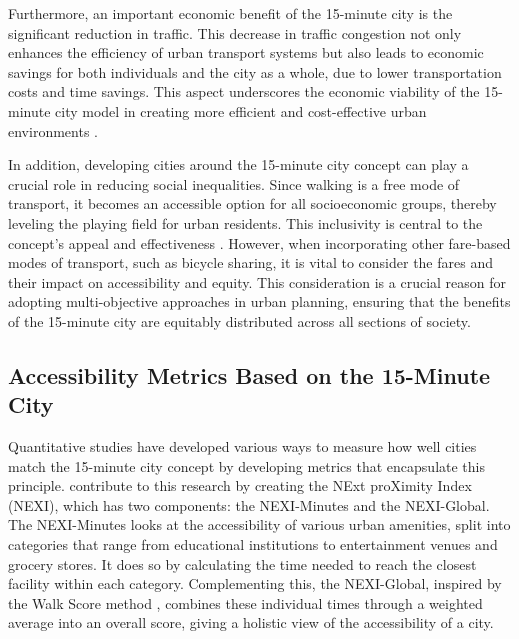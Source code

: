 Furthermore, an important economic benefit of the 15-minute city is the significant reduction in traffic. 
This decrease in traffic congestion not only enhances the efficiency of urban transport systems but also leads to economic savings for both individuals and the city as a whole, due to lower transportation costs and time savings.
This aspect underscores the economic viability of the 15-minute city model in creating more efficient and cost-effective urban environments .

In addition, developing cities around the 15-minute city concept can play a crucial role in reducing social inequalities. 
Since walking is a free mode of transport, it becomes an accessible option for all socioeconomic groups, thereby leveling the playing field for urban residents. 
This inclusivity is central to the concept's appeal and effectiveness .
However, when incorporating other fare-based modes of transport, such as bicycle sharing, it is vital to consider the fares and their impact on accessibility and equity. 
This consideration is a crucial reason for adopting multi-objective approaches in urban planning, ensuring that the benefits of the 15-minute city are equitably distributed across all sections of society.


\subsection{Accessibility Metrics Based on the 15-Minute City}
\label{subsec:accessibility_metrics_based_on_the_15_minute_city}

Quantitative studies have developed various ways to measure how well cities match the 15-minute city concept by developing metrics that encapsulate this principle.  
 contribute to this research by creating the NExt proXimity Index (NEXI), which has two components: the NEXI-Minutes and the NEXI-Global. 
The NEXI-Minutes looks at the accessibility of various urban amenities, split into categories that range from educational institutions to entertainment venues and grocery stores.
It does so by calculating the time needed to reach the closest facility within each category.
Complementing this, the NEXI-Global, inspired by the Walk Score method , combines these individual times through a weighted average into an overall score, giving a holistic view of the accessibility of a city.

